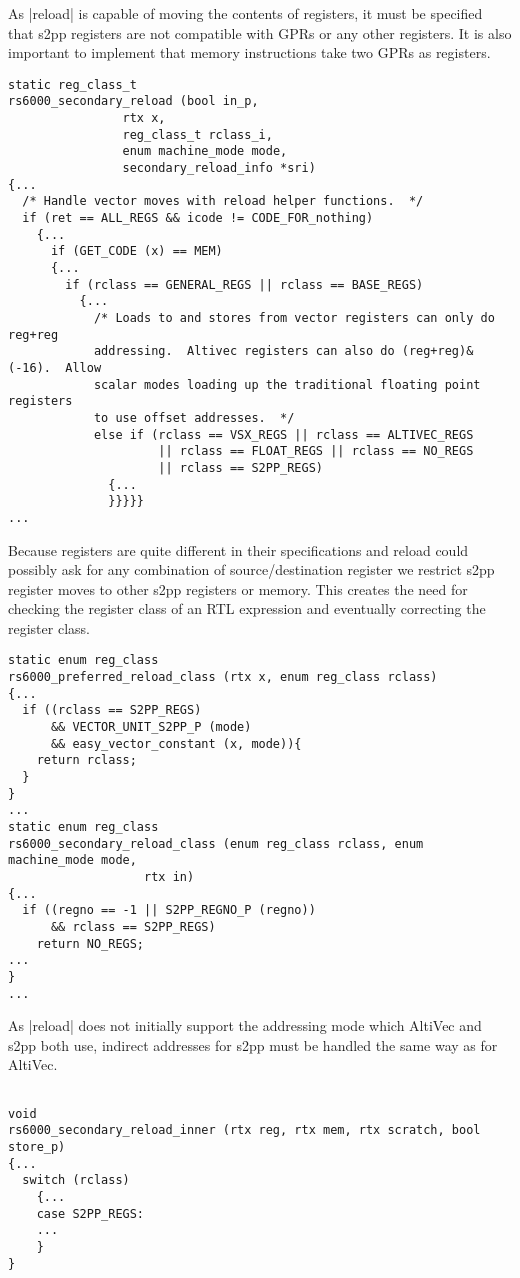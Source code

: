 As |reload| is capable of moving the contents of registers, it must be specified that s2pp registers are not compatible with GPRs or any other registers.
It is also important to implement that memory instructions take two GPRs as registers.
\begin{lstlisting}
static reg_class_t
rs6000_secondary_reload (bool in_p,
                rtx x,
                reg_class_t rclass_i,
                enum machine_mode mode,
                secondary_reload_info *sri)
{...
  /* Handle vector moves with reload helper functions.  */
  if (ret == ALL_REGS && icode != CODE_FOR_nothing)
    {...
      if (GET_CODE (x) == MEM)
      {...
        if (rclass == GENERAL_REGS || rclass == BASE_REGS)
          {...
            /* Loads to and stores from vector registers can only do reg+reg
            addressing.  Altivec registers can also do (reg+reg)&(-16).  Allow
            scalar modes loading up the traditional floating point registers
            to use offset addresses.  */
            else if (rclass == VSX_REGS || rclass == ALTIVEC_REGS
                     || rclass == FLOAT_REGS || rclass == NO_REGS
                     || rclass == S2PP_REGS)
              {...
              }}}}}
...
\end{lstlisting}

Because registers are quite different in their specifications and reload could possibly ask for any combination of source/destination register we restrict s2pp register moves to other s2pp registers or memory.
This creates the need for checking the register class of an RTL expression and eventually correcting the register class.
\begin{lstlisting}
static enum reg_class
rs6000_preferred_reload_class (rtx x, enum reg_class rclass)
{...
  if ((rclass == S2PP_REGS)
      && VECTOR_UNIT_S2PP_P (mode)
      && easy_vector_constant (x, mode)){
    return rclass;
  }
}
...
static enum reg_class
rs6000_secondary_reload_class (enum reg_class rclass, enum machine_mode mode,
                   rtx in)
{...
  if ((regno == -1 || S2PP_REGNO_P (regno))
      && rclass == S2PP_REGS)
    return NO_REGS;
...
}
...
\end{lstlisting}

As |reload| does not initially support the addressing mode which AltiVec and s2pp both use, indirect addresses for s2pp must be handled the same way as for AltiVec.
\begin{lstlisting}

void
rs6000_secondary_reload_inner (rtx reg, rtx mem, rtx scratch, bool store_p)
{...
  switch (rclass)
    {...
    case S2PP_REGS:
    ...
    }
}
\end{lstlisting}

